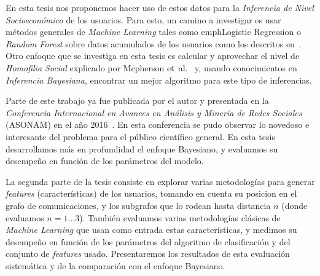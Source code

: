 \documentclass{article}
\begin{document}
En esta tesis nos proponemos hacer uso de estos datos para la \emph{Inferencia de Nivel Socioeconómico} de los usuarios. Para esto, un camino a investigar es usar métodos generales de \emph{Machine Learning} tales como emph{Logistic Regression} o \emph{Random Forest} sobre datos acumulados de los usuarios como los descritos en~\cite{oskarsdottir2016}. Otro enfoque que se investiga en esta tesis es calcular y aprovechar el nivel de \emph{Homofilia Social} explicado por Mcpherson et~al.~\cite{mcpherson2001birds} y, usando conocimientos en \emph{Inferencia Bayesiana}, encontrar un mejor algoritmo para este tipo de inferencias.

Parte de este trabajo ya fue publicada por el autor y presentada en la \emph{Conferencia Internacional en Avances en Análisis y Minería de Redes Sociales} (ASONAM) en el año 2016~\cite{fixman2016bayesian}. En esta conferencia se pudo observar lo novedoso e interesante del problema para el público científico general.
En esta tesis desarrollamos más en profundidad el enfoque Bayesiano, y evaluamos su desempeño en función de los parámetros del modelo.

La segunda parte de la tesis consiste en explorar varias metodologías para generar \emph{features} (características) de los usuarios, tomando en cuenta su posicion en el grafo de comunicaciones, y los subgrafos que lo rodean hasta distancia $n$ (donde evaluamos $n = 1 \ldots 3$). También evaluamos varias metodologías clásicas de \emph{Machine Learning} que usan como entrada estas características, y medimos su desempeño en función de los parámetros del algoritmo de clasificación y del conjunto de \emph{features} usado. Presentaremos los resultados de esta evaluación sistemática y de la comparación con el enfoque Bayesiano.

{}
\end{document}
